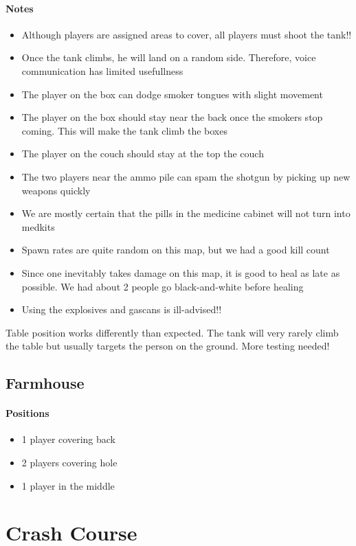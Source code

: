 \paragraph{Notes}
\begin{itemize}
\item Although players are assigned areas to cover, all players must shoot the tank!!
\item Once the tank climbs, he will land on a random side. Therefore, voice communication has limited usefullness
\item The player on the box can dodge smoker tongues with slight movement
\item The player on the box should stay near the back once the smokers stop coming. This will make the tank climb the boxes
\item The player on the couch should stay at the top the couch
\item The two players near the ammo pile can spam the shotgun by picking up new weapons quickly
\item We are mostly certain that the pills in the medicine cabinet will not turn into medkits
\item Spawn rates are quite random on this map, but we had a good kill count
\item Since one inevitably takes damage on this map, it is good to heal as late as possible. We had about 2 people go black-and-white before healing
\item Using the explosives and gascans is ill-advised!!
\end{itemize}
Table position works differently than expected. The tank will very rarely climb the table but usually targets the person on the ground. More testing needed!

\subsection{Farmhouse}
\paragraph{Positions}
\begin{itemize}
\item 1 player covering back
\item 2 players covering hole
\item 1 player in the middle
\end{itemize}


\section{Crash Course}

